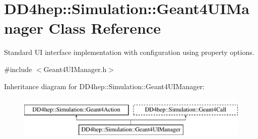 \hypertarget{class_d_d4hep_1_1_simulation_1_1_geant4_u_i_manager}{}\section{D\+D4hep\+:\+:Simulation\+:\+:Geant4\+U\+I\+Manager Class Reference}
\label{class_d_d4hep_1_1_simulation_1_1_geant4_u_i_manager}


Standard UI interface implementation with configuration using property options.  




{\ttfamily \#include $<$Geant4\+U\+I\+Manager.\+h$>$}

Inheritance diagram for D\+D4hep\+:\+:Simulation\+:\+:Geant4\+U\+I\+Manager\+:\begin{figure}[H]
\begin{center}
\leavevmode
\includegraphics[height=2.000000cm]{class_d_d4hep_1_1_simulation_1_1_geant4_u_i_manager}
\end{center}
\end{figure}
